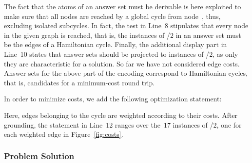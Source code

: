 The fact that the atoms of an answer set must be derivable is here exploited
to make sure that all nodes are reached
by a global cycle from node~, thus, excluding isolated subcycles.
In fact, the test in Line~8 stipulates that every node in the given graph
is reached, that is, the instances of /$2$ in an answer set
must be the edges of a Hamiltonian cycle.%
Finally, the additional display part in Line~10 states that answer
sets should be projected to instances of /$2$, as only they %
are characteristic for a solution.
So far we have not considered edge costs.
Answer sets for the above part of the encoding correspond to Hamiltonian cycles,
that is, candidates for a minimum-cost round trip.

In order to minimize costs,
we add the following optimization statement:
%

%
Here, edges belonging to the cycle are weighted according to their costs.
After grounding, the %
 statement
in Line~12 ranges over the~17 instances
of /$2$, one for each weighted edge in Figure~\ref{fig:costs}.

\subsubsection{Problem Solution}\label{subsec:tsp:solution}


